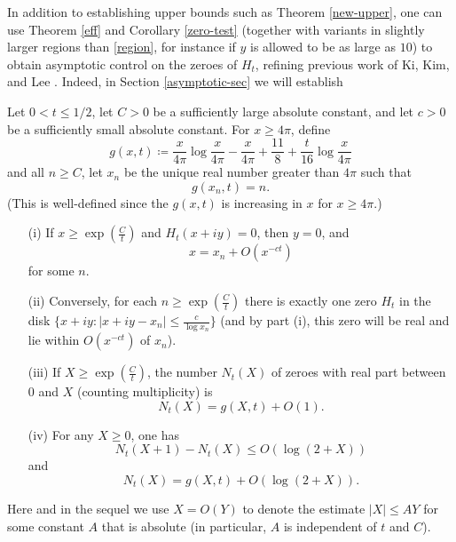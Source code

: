 In addition to establishing upper bounds such as Theorem \ref{new-upper}, one can use Theorem \ref{eff} and Corollary \ref{zero-test} (together with variants in slightly larger regions than \eqref{region}, for instance if $y$ is allowed to be as large as $10$) to obtain asymptotic control on the zeroes of $H_t$, refining previous work of Ki, Kim, and Lee \cite{kkl}.  Indeed, in Section \ref{asymptotic-sec} we will establish

\begin{theorem}\label{Zero}  Let $0 < t \leq 1/2$, let $C>0$ be a sufficiently large absolute constant, and let $c>0$ be a sufficiently small absolute constant.  For $x \geq 4\pi$, define
$$ g(x,t) \coloneqq  \frac{x}{4\pi} \log \frac{x}{4\pi} - \frac{x}{4\pi} + \frac{11}{8} + \frac{t}{16} \log \frac{x}{4\pi} $$
and all $n \geq C$, let $x_n$ be the unique real number greater than $4\pi$ such that
\begin{equation}\label{lip}
 g(x_n,t) = n.
\end{equation}
(This is well-defined since the $g(x,t)$ is increasing in $x$ for $x \geq 4\pi$.)
\begin{itemize}
\item[(i)]  If $x \geq \exp(\frac{C}{t})$ and $H_t(x+iy)=0$, then $y=0$, and
$$ x = x_n + O(x^{-ct})$$
for some $n$.  
\item[(ii)]  Conversely, for each $n \geq \exp( \frac{C}{t} )$ there is exactly one zero $H_t$ in the disk $\{ x+iy: |x+iy - x_n| \leq \frac{c}{\log x_n} \}$ (and by part (i), this zero will be real and lie within $O(x^{-ct})$ of $x_n$).
\item[(iii)]  If $X \geq \exp(\frac{C}{t})$, the number $N_t(X)$ of zeroes with real part between $0$ and $X$ (counting multiplicity) is
$$ N_t(X) = g(X,t) + O(1).$$
\item[(iv)]  For any $X \geq 0$, one has
$$ N_t(X+1) - N_t(X) \leq O( \log(2+X) )$$
and
$$ N_t(X) = g(X,t) + O( \log(2+X) ).$$
\end{itemize}
Here and in the sequel we use $X = O(Y)$ to denote the estimate $|X| \leq AY$ for some constant $A$ that is absolute (in particular, $A$ is independent of $t$ and $C$).
\end{theorem}

